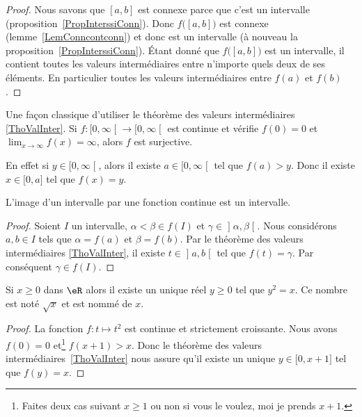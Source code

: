 \begin{proof}
	Nous savons que \( [a,b]\) est connexe parce que c'est un intervalle (proposition~\ref{PropInterssiConn}). Donc \( f\big( [a,b] \big)\) est connexe (lemme~\ref{LemConncontconn}) et donc est un intervalle (à nouveau la proposition~\ref{PropInterssiConn}). Étant donné que \( f\big( [a,b] \big)\) est un intervalle, il contient toutes les valeurs intermédiaires entre n'importe quels deux de ses éléments. En particulier toutes les valeurs intermédiaires entre \( f(a)\) et \( f(b)\).
\end{proof}

\begin{normaltext}      \label{NORMooTQWWooQVPWIJ}
	Une façon classique d'utiliser le théorème des valeurs intermédiaires \ref{ThoValInter}. Si \( f\colon \mathopen[ 0 , \infty \mathclose[\to \mathopen[ 0 , \infty \mathclose[\) est continue et vérifie \( f(0)=0\) et \( \lim_{x\to \infty} f(x)=\infty\), alors \( f\) est surjective.

	En effet si \( y\in \mathopen[ 0 , \infty \mathclose[\), alors il existe \( a\in\mathopen[ 0 , \infty \mathclose[\) tel que \( f(a)>y\). Donc il existe \( x\in \mathopen[ 0 , a \mathclose]\) tel que \( f(x)=y\).
\end{normaltext}

\begin{corollary}       \label{CorImInterInter}
	L'image d'un intervalle par une fonction continue est un intervalle.
\end{corollary}

\begin{proof}
	Soient \( I\) un intervalle, \( \alpha<\beta\in f(I)\) et \( \gamma\in\mathopen] \alpha , \beta \mathclose[\). Nous considérons \(a,b\in I\) tels que \( \alpha=f(a)\) et \( \beta=f(b)\). Par le théorème des valeurs intermédiaires \ref{ThoValInter}, il existe \( t\in\mathopen] a , b \mathclose[\) tel que \( f(t)=\gamma\). Par conséquent \( \gamma\in f(I)\).
\end{proof}

\begin{corollaryDef}     \label{DEFooGQTYooORuvQb}
	Si \( x\geq 0\) dans \( \eR\) alors il existe un unique réel \( y\geq 0\) tel que \( y^2=x\). Ce nombre est noté \( \sqrt{x}\) et est nommé  de \( x\).
\end{corollaryDef}

\begin{proof}
	La fonction \( f\colon t\mapsto t^2\) est continue et strictement croissante. Nous avons \( f(0)=0\) et\footnote{Faites deux cas suivant \( x\geq 1\) ou non si vous le voulez, moi je prends \( x+1\).} \( f(x+1)>x\). Donc le théorème des valeurs intermédiaires~\ref{ThoValInter} nous assure qu'il existe un unique \( y\in\mathopen[ 0 , x+1 \mathclose]\) tel que \( f(y)=x\).
\end{proof}

